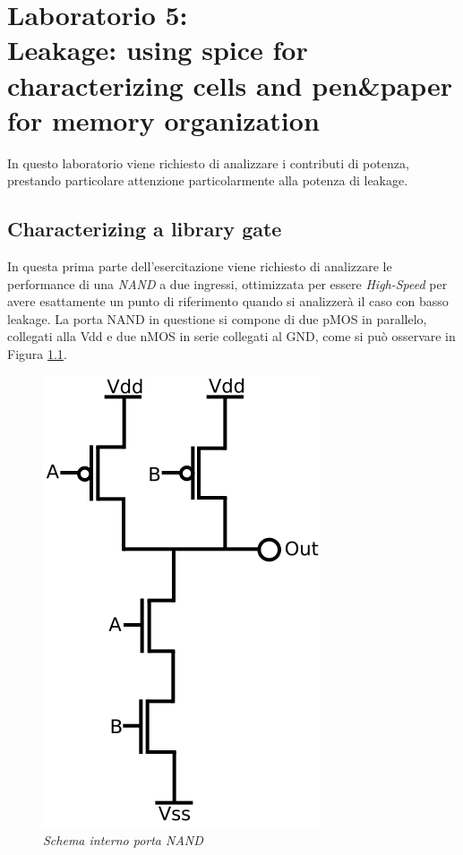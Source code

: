 \chapter{Laboratorio 5: \\Leakage: using spice for characterizing cells and pen\&paper for memory organization}
In questo laboratorio viene richiesto di analizzare i contributi di potenza, prestando particolare attenzione particolarmente alla potenza di leakage.

\section{Characterizing a library gate}
In questa prima parte dell'esercitazione viene richiesto di analizzare le performance di una \textit{NAND} a due ingressi, ottimizzata per essere \textit{High-Speed} per avere esattamente un punto di riferimento quando si analizzerà il caso con basso leakage. La porta NAND in questione si compone di due pMOS in parallelo, collegati alla Vdd e due nMOS in serie collegati al GND, come si può osservare in Figura \ref{nand_circuit}. \\
\begin{figure}[!htb]
	\centering
	\includegraphics[scale=0.3]{immagini/nand_circuit}
	\caption{\textit{Schema interno porta NAND}}
	\label{nand_circuit}
\end{figure}
